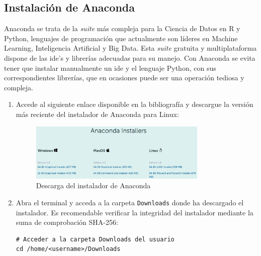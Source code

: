 \subsection{Instalación de Anaconda}
\label{subsec:instalacion-anaconda}

Anaconda se trata de la \textit{suite} más compleja para la Ciencia de Datos en R y Python, lenguajes de programación que actualmente son líderes en Machine Learning, Inteligencia Artificial y Big Data. Esta \textit{suite} gratuita y multiplataforma dispone de las \gls{ide}'s y librerías adecuadas para su manejo. Con Anaconda se evita tener que instalar manualmente un \gls{ide} y el lenguaje Python, con sus correspondientes librerías, que en ocasiones puede ser una operación tediosa y compleja.

\begin{enumerate}
    \item Accede al siguiente enlace \cite{inst-conda} disponible en la bibliografía y descargue la versión más reciente del instalador de Anaconda para Linux:
    
    \begin{figure}[ht]
    \centering
    \includegraphics[width=0.8\textwidth]{img/appendix/C/anaconda-installer.png}
    \caption{\label{fig:anaconda-download}Descarga del instalador de Anaconda \cite{inst-conda}}
    \end{figure}

    \item Abra el terminal y acceda a la carpeta \texttt{Downloads} donde ha descargado el instalador. Es recomendable verificar la integridad del instalador mediante la suma de comprobación SHA-256:
    
    \vspace{0.5cm}
    
    
\begin{lstlisting}[language=iPython,caption=Verificación de la integridad de la instalación de Anaconda,captionpos=b,label={lst:verificar-sha256}]
# Acceder a la carpeta Downloads del usuario
cd /home/<username>/Downloads


\end{lstlisting}
\end{enumerate}
